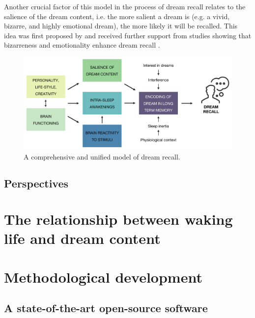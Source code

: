 Another crucial factor of this model in the process of dream recall relates to the salience of the dream content, i.e. the more salient a dream is (e.g. a vivid, bizarre, and highly emotional dream), the more likely it will be recalled. This idea was first proposed by \citet{cohen_test_1974} and received further support from studies showing that bizarreness  and emotionality enhance dream recall \citep{cipolli_bizarreness_1993, schredl_emotions_1998}.

\begin{figure}[!htbp]
	\includegraphics[width=\textwidth]{Fig/Discussion/schema_dream_recall.png}
	\caption[A comprehensive and unified model of dream recall]{A comprehensive and unified model of dream recall.}
	\label{fig:disc:drf:model}
\end{figure}

\section{Perspectives}
\label{disc:drf:perspectives}


\cleardoublepage
\chapter{The relationship between waking life and dream content}
\label{disc:wle}

\cleardoublepage
\chapter{Methodological development}
\label{disc:methods}

\section{A state-of-the-art open-source software}
\label{disc:methods:software}

